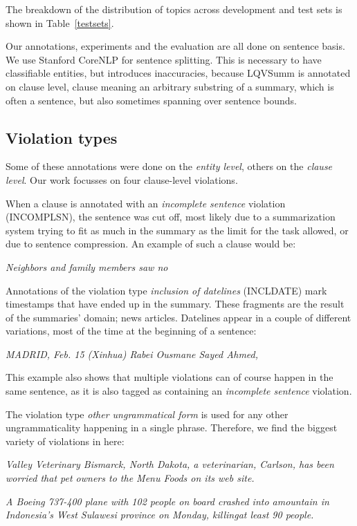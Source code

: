 \documentclass[a4paper,10pt]{scrartcl}
\theoremstyle{style}
\begin{document}
The breakdown of the distribution of topics across development and test sets is shown in Table~\ref{testsets}.

Our annotations, experiments and the evaluation are all done on sentence basis. We use Stanford CoreNLP \citep{manning-EtAl:2014:P14-5} for sentence splitting. This is necessary to have classifiable entities, but introduces inaccuracies, because LQVSumm is annotated on clause level, clause meaning an arbitrary substring of a summary, which is often a sentence, but also sometimes spanning over sentence bounds.

\subsection{Violation types}

Some of these annotations were done on the \textit{entity level}, others on the \textit{clause level}. Our work focusses on four clause-level violations.

When a clause is annotated with an \textit{incomplete sentence} violation (INCOMPLSN), the sentence was cut off, most likely due to a summarization system trying to fit as much in the summary as the limit for the task allowed, or due to sentence compression. An example of such a clause would be:

\quad\textit{Neighbors and family members saw no}

Annotations of the violation type \textit{inclusion of datelines} (INCLDATE) mark timestamps that have ended up in the summary. These fragments are the result of the summaries' domain; news articles. Datelines appear in a couple of different variations, most of the time at the beginning of a sentence:

\quad\textit{MADRID, Feb. 15 (Xinhua) Rabei Ousmane Sayed Ahmed,}

This example also shows that multiple violations can of course happen in the same sentence, as it is also tagged as containing an \textit{incomplete sentence} violation.

The violation type \textit{other ungrammatical form} is used for any other ungrammaticality happening in a single phrase. Therefore, we find the biggest variety of violations in here:

\quad\textit{Valley Veterinary Bismarck, North Dakota, a veterinarian, Carlson, has been worried that pet owners to the Menu Foods on its web site.}

\quad\textit{A Boeing 737-400 plane with 102 people on board crashed into amountain in Indonesia's West Sulawesi province on Monday, killingat least 90 people.}
\end{document}
